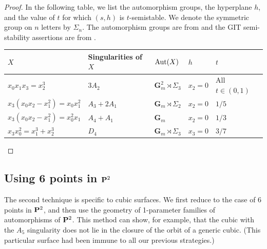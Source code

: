 \documentclass[12pt,reqno]{amsart}
\numberwithin{equation}{section}
\newcommand{\G}{\mathbf G}
\begin{document}
\begin{proof}
  In the following table, we list the automorphism groups, the hyperplane $h$, and the value of $t$ for which $(s,h)$ is $t$-semistable.
  We denote the symmetric group on $n$ letters by $\Sigma_n$.
  The automorphism groups are from \cite{sak:10} and the GIT semi-stability assertions are from \cite{gal.mar:19}.
  \begin{center}
  \begin{tabular}{l l l l l}
    \toprule
    $X$ & Singularities of $X$& $\Aut(X)$ & $h$ & $t$\\
    \midrule
    $x_0x_1x_3 = x_2^3$& $3A_2$&$\G_m^2 \rtimes \Sigma_3$ & $x_2 = 0$ & All $t \in (0,1)$\\
    $x_3(x_0x_2-x_1^2) = x_0x_1^2$& $A_3+2A_1$&$\G_m \rtimes \Sigma_2$ & $x_2 = 0$ & $1/5$ \\
    $x_3(x_0x_2-x_1^2) = x_0^2x_1$&$A_4+A_1$& $\G_m$ & $x_2 = 0$ & $1/3$\\
    $x_3x_0^2 = x_1^3 + x_2^3$&$D_4$& $\G_m \rtimes \Sigma_3$ & $x_3 = 0$ & $3/7$\\
    \bottomrule
  \end{tabular}
\end{center}
\end{proof}

\subsection{Using 6 points in $\P^2$}
The second technique is specific to cubic surfaces.
We first reduce to the case of 6 points in $\P^2$, and then use the geometry of 1-parameter families of automorphisms of $\P^2$.
This method can show, for example, that the cubic with the $A_5$ singularity does not lie in the closure of the orbit of a generic cubic.
(This particular surface had been immune to all our previous strategies.)
\end{document}
